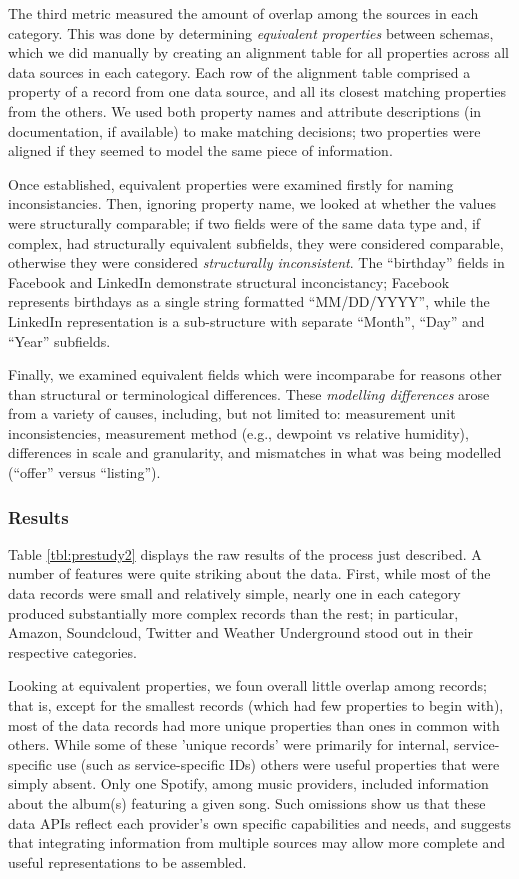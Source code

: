 \documentclass{sigchi}
\begin{document}
The third metric measured the amount of overlap among the sources in each category.  This was done by determining \emph{equivalent properties} between schemas, which we did manually by creating an alignment table for all properties across all data sources in each category.  Each row of the alignment table comprised a property of a record from one data source, and all its closest matching properties from the others.  We used both property names and attribute descriptions (in documentation, if available) to make matching decisions; two properties were aligned if they seemed to model the same piece of information.

Once established, equivalent properties were examined firstly for naming inconsistancies.  Then, ignoring property name, we looked at whether the values were structurally comparable; if two fields were of the same data type and, if complex, had structurally equivalent subfields, they were considered comparable, otherwise they were considered \emph{structurally inconsistent}.  The ``birthday'' fields in Facebook and LinkedIn demonstrate structural inconcistancy; Facebook represents birthdays as a single string formatted ``MM/DD/YYYY'', while the LinkedIn representation is a sub-structure with separate ``Month'', ``Day'' and ``Year'' subfields.

Finally, we examined equivalent fields which were incomparabe for reasons other than structural or terminological differences.  These \emph{modelling differences} arose from a variety of causes, including, but not limited to: measurement unit inconsistencies, measurement method (e.g., dewpoint vs relative humidity), differences in scale and granularity, and mismatches in what was being modelled (``offer'' versus ``listing'').

\subsubsection{Results}
Table \ref{tbl:prestudy2} displays the raw results of the process just described.  A number of features were quite striking about the data. First, while most of the data records were small and relatively simple, nearly one in each category produced substantially more complex records than the rest; in particular, Amazon, Soundcloud, Twitter and Weather Underground stood out in their respective categories. 

Looking at equivalent properties, we foun overall little overlap among records; that is, except for the smallest records (which had few properties to begin with), most of the data records had more unique properties than ones in common with others.  While some of these 'unique records' were primarily for internal, service-specific use (such as service-specific IDs) others were useful properties that were simply absent.  Only one Spotify, among music providers, included information about the album(s) featuring a given song.  Such omissions show us that these data APIs reflect each provider's own specific capabilities and needs, and suggests that integrating information from multiple sources may allow more complete and useful representations to be assembled.
\end{document}
